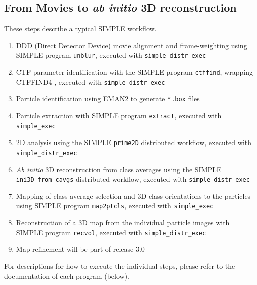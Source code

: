 \documentclass[a4paper,11pt]{article}
\newcommand{\prgname}[1]{\textcolor{NavyBlue}{\texttt{#1}}}
\begin{document}
\subsection{From Movies to \textit{ab initio} 3D reconstruction}
These steps describe a typical SIMPLE workflow.
\begin{enumerate}
\item DDD (Direct Detector Device) movie alignment and frame-weighting using SIMPLE program \prgname{unblur}, executed with \texttt{simple\_distr\_exec}
\item CTF parameter identification with the SIMPLE program \prgname{ctffind}, wrapping CTFFIND4 \citep{rohou2015ctffind4}, executed with \texttt{simple\_distr\_exec}
\item Particle identification using EMAN2 \citep{Tang:2007aa} to generate \texttt{*.box} files
\item Particle extraction with SIMPLE program \prgname{extract}, executed with \texttt{simple\_exec}
\item 2D analysis using the SIMPLE \prgname{prime2D} distributed workflow, executed with \texttt{simple\_distr\_exec}
\item \textit{Ab initio} 3D reconstruction from class averages using the SIMPLE \prgname{ini3D\_from\_cavgs} distributed workflow, executed with \texttt{simple\_distr\_exec}
\item Mapping of class average selection and 3D class orientations to the particles using SIMPLE program \prgname{map2ptcls}, executed with \texttt{simple\_exec}
\item Reconstruction of a 3D map from the individual particle images with SIMPLE program \prgname{recvol}, executed with \texttt{simple\_distr\_exec}
\item Map refinement will be part of release 3.0
\end{enumerate}
For descriptions for how to execute the individual steps, please refer to the documentation of each program (below).
\end{document}
